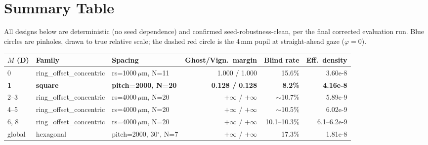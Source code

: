 \section{Summary Table}

All designs below are deterministic (no seed dependence) and confirmed
seed-robustness-clean, per the final corrected evaluation run. Blue circles
are pinholes, drawn to true relative scale; the dashed red circle is the
4\,mm pupil at straight-ahead gaze ($\varphi=0$).

\begin{center}
\begin{tabular}{lllrrr}
\toprule
$M$ (D) & Family & Spacing & Ghost/Vign.\ margin & Blind rate & Eff.\ density \\
\midrule
0 & ring\_offset\_concentric & rs=1000\,$\mu$m, N=11 & 1.000 / 1.000 & 15.6\% & 3.60e-8 \\
\textbf{1} & \textbf{square} & \textbf{pitch=2000, N=20} & \textbf{0.128 / 0.128} & \textbf{8.2\%} & \textbf{4.16e-8} \\
2--3 & ring\_offset\_concentric & rs=4000\,$\mu$m, N=20 & $+\infty$ / $+\infty$ & $\sim$10.7\% & 5.89e-9 \\
4--5 & ring\_offset\_concentric & rs=4000\,$\mu$m, N=20 & $+\infty$ / $+\infty$ & $\sim$10.5\% & 6.02e-9 \\
6, 8 & ring\_offset\_concentric & rs=4000\,$\mu$m, N=20 & $+\infty$ / $+\infty$ & 10.1--10.3\% & 6.1--6.2e-9 \\
global & hexagonal & pitch=2000, 30$^\circ$, N=7 & $+\infty$ / $+\infty$ & 17.3\% & 1.81e-8 \\
\bottomrule
\end{tabular}
\end{center}


\newpage
